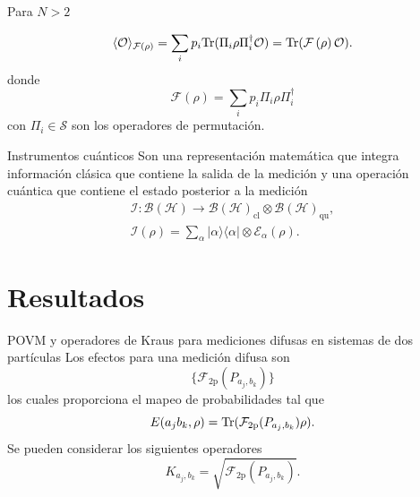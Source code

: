\documentclass[svgnames,12pt,aspectratio=149]{beamer}
\newcommand{\ra}{\rangle}
\newcommand{\la}{\langle}
\newcommand{\rala}{\rangle\langle}
\newcommand{\tr}{{\rm Tr}}
\newcommand{\E}{\mathcal{E}}
\newcommand{\fuzzy}[1]{\mathcal{F}\left(#1\right)}
\newcommand{\permut}[2]{\Pi_{#1}#2\Pi_{#1}^{\dagger}}
\begin{document}
\begin{frame}{Para $N>2$}

\begin{equation*}\label{eq:expected-value-fm-general}
    \la \mathcal{O}\ra_{\fuzzy{\rho}}=\sum_{i}p_i\tr(\permut{i}{\rho}\mathcal{O}) =\tr(\fuzzy{\rho}\mathcal{O}).
\end{equation*} donde \begin{equation*}\label{eq:fuzzy-op-nparticles}
    \fuzzy{\rho}=\sum_{i}p_{i}\permut{i}{\rho}
 \end{equation*} con $\Pi_i \in \mathcal{S}$ son los operadores de permutación.

\end{frame}

\begin{frame}{Instrumentos cuánticos}
  Son una representación matemática que integra información clásica que contiene la salida de la medición y una operación cuántica que contiene el estado posterior a la medición \begin{equation*}
    \begin{split}
        \mathcal{I}: \mathcal{B(H)}\rightarrow\mathcal{B(H)}_{\text{cl}}\otimes \mathcal{B(H)}_{\text{qu}},\\
    \mathcal{I}(\rho)=\sum_\alpha |\alpha\rala\alpha|\otimes \E_\alpha(\rho).
    \end{split}
\end{equation*}
\end{frame}


\section{Resultados}
\begin{frame}{POVM y operadores de Kraus para mediciones difusas en sistemas de dos partículas}
  Los efectos para una medición difusa son \[\{\mathcal{F}_{2\text{p}}(P_{a_j,b_k})\}\]los cuales proporciona el mapeo de probabilidades tal que \[   E(a_j b_k, \rho)= \tr(\mathcal{F}_{2\text{p}}({P_{a_j,b_k}})\rho).\] %
  Se pueden considerar los siguientes operadores \[K_{a_j,b_k}=\sqrt{\mathcal{F}_{2\text{p}}(P_{a_j,b_k})}.\]
\end{frame}
\end{document}
